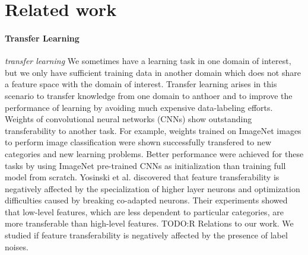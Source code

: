 \section{Related work}
\label{sec:related}

%

\paragraph{Transfer Learning}
\noindent \textit{transfer learning}
\noindent
We sometimes have a learning task in one domain of interest, but we only have sufficient training data in another domain which does not share a feature space with the domain of interest.
Transfer learning arises in this scenario to transfer knowledge from one domain to anthoer and to improve the performance of learning by avoiding much expensive data-labeling efforts.\cite{pan2010survey}
Weights of convolutional neural networks (CNNs) show outstanding transferability to another task.
For example, weights trained on ImageNet images to perform image classification were shown successfully transfered to new categories and new learning problems\cite{girshick2014rich,long2015fully,shin2016deep}.
Better performance were achieved for these tasks by using ImageNet pre-trained CNNs as initialization than training full model from scratch.
Yosinski et al. discovered that feature transferability is negatively affected by the specialization of higher layer neurons and optimization difficulties caused by breaking co-adapted neurons.
Their experiments showed that low-level features, which are less dependent to particular categories, are more transferable than high-level features.
{TODO:R} Relations to our work.
We studied if feature transferability is negatively affected by the presence of label noises.

